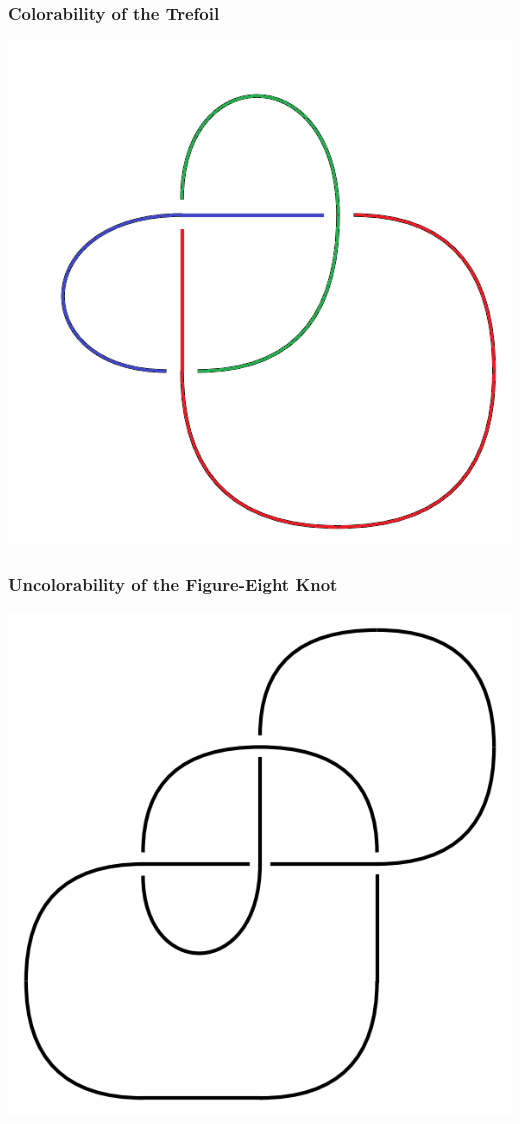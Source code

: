 \documentclass{beamer}
\begin{document}
\begin{frame}
  \frametitle{Colorability of the Trefoil}
  \begin{center}
    \includegraphics[scale=.4]{trefoil-c}
  \end{center}
\end{frame}


\begin{frame}
  \frametitle{Uncolorability of the Figure-Eight Knot}
  \begin{center}
    \includegraphics[scale=.4]{figure-eight}
  \end{center}
\end{frame}
\end{document}

